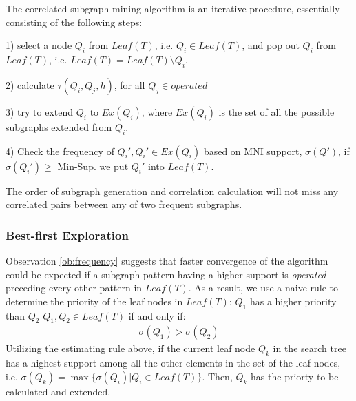 \par The correlated subgraph mining algorithm is an iterative procedure,
essentially consisting of the following steps: \par 1) select a node $Q_i$ from
$Leaf(T)$, i.e. $Q_i\in Leaf(T)$, and pop out $Q_i$ from $Leaf(T)$, i.e.
$Leaf(T)=Leaf(T)\setminus Q_i$. \par 2) calculate $\tau(Q_i,Q_j,h)$, for all
$Q_j\in operated$ \par 3) try to extend $Q_i$ to $Ex(Q_i)$, where $Ex(Q_i)$ is
the set of all the possible subgraphs extended from $Q_i$. \par 4) Check the
frequency of $Q_i',Q_i'\in Ex(Q_i)$ based on MNI support, $\sigma(Q')$, if
$\sigma(Q_i')\ge$ {\sf Min-Sup}. we put $Q_i'$ into $Leaf(T)$.
\begin{thrm}
	The order of subgraph generation and correlation calculation will not miss
	any correlated pairs between any of two frequent subgraphs.
\end{thrm}

\subsubsection{Best-first Exploration}
\label{subsubsec:exact_algo_bestfs}
Observation \ref{ob:frequency} suggests that faster convergence of the algorithm
could be expected if a subgraph pattern having a higher support is
\textit{operated} preceding every other pattern in $Leaf(T)$. As a result, we
use a naive rule to determine the priority of the leaf nodes in $Leaf(T)$: $Q_1$
has a higher priority than $Q_2$ \forall $Q_1, Q_2 \in Leaf(T)$ if and only if:
\begin{align*}\sigma(Q_1)>\sigma(Q_2)\end{align*}
Utilizing the estimating rule above, if the current leaf node $Q_k$ in the search tree has a highest support among all the other elements in the set of the leaf nodes, i.e. $\sigma(Q_k)=\max\{\sigma(Q_i)|Q_i\in Leaf(T)\}$. Then, $Q_k$ has the priorty to be calculated and extended.


